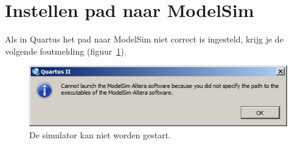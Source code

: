 \documentclass[a4paper,12pt,fleqn,twoside]{book}
\def\tutpicscale{0.455}
\newcommand{\menu}[1]{\texttt{\textbf{#1}}}
\newcommand{\knop}[1]{\texttt{\textbf{#1}}}
\newcommand{\naam}[1]{\texttt{#1}}
\def\pijl{$\rightarrow$}%
\begin{document}
%
%
%
%
%
%


\section{Instellen pad naar ModelSim}
\label{sec:instellenmodelsimpad}
Als in Quartus het pad naar ModelSim niet correct is ingesteld, krijg je de volgende foutmelding 
(figuur~\ref{fig:210modelsimpath_121}).

\begin{figure}[H]
\centering
\includegraphics[scale=\tutpicscale]{210modelsimpath_121.png}
\caption{De simulator kan niet worden gestart.}
\label{fig:210modelsimpath_121}
\end{figure}
\end{document}
